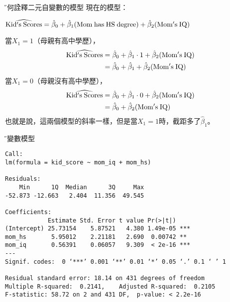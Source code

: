 \documentclass[xcolor=dvipsnames]{beamer}
\begin{document}
\begin{frame}{\H 如何詮釋二元自變數的模型}
現在的模型：
\begin{center}
$\widehat{\mathrm {Kid's\hspace{.25em} Scores}}=\hat{\beta}_{0}+\hat{\beta}_{1}(\mathrm {Mom\hspace{.25em} has\hspace{.25em} HS\hspace{.25em} degree})+\hat{\beta}_{2}(\mathrm {Mom's\hspace{.25em} IQ})$
\end{center}
當$X_{1}=1$（母親有高中學歷），
\begin{align*}
\widehat{\mathrm {Kid's\hspace{.25em} Scores}} & =\hat{\beta}_{0}+\hat{\beta}_{1}\cdot 1+\hat{\beta}_{2}(\mathrm {Mom's\hspace{.25em} IQ})\\
& = \hat{\beta}_{0}+\hat{\beta}_{1}+\hat{\beta}_{2}(\mathrm {Mom's\hspace{.25em} IQ})
\end{align*}
當$X_{1}=0$（母親沒有高中學歷），
\begin{align*}
\widehat{\mathrm {Kid's\hspace{.25em} Scores}} & =\hat{\beta}_{0}+\hat{\beta}_{1}\cdot 0+\hat{\beta}_{2}(\mathrm {Mom's\hspace{.25em} IQ})\\
& = \hat{\beta}_{0}+\hat{\beta}_{2}(\mathrm {Mom's\hspace{.25em} IQ})
\end{align*}
也就是說，這兩個模型的斜率一樣，但是當$X_{1}=1$時，截距多了$\hat{\beta}_{1}$。
\end{frame}
\begin{frame}[fragile=singleslide]{\H 雙變數模型}
\begin{Verbatim}[frame=single,label=R code,
fontseries=b,xleftmargin=2mm,commandchars=\\\{\},
formatcom=\color{blue}]
Call:
lm(formula = kid_score ~ mom_iq + mom_hs)

Residuals:
    Min      1Q  Median      3Q     Max 
-52.873 -12.663   2.404  11.356  49.545 

Coefficients:
            Estimate Std. Error t value Pr(>|t|)    
(Intercept) 25.73154    5.87521   4.380 1.49e-05 ***
mom_hs       5.95012    2.21181   2.690  0.00742 ** 
mom_iq       0.56391    0.06057   9.309  < 2e-16 ***
---
Signif. codes:  0 ‘***’ 0.001 ‘**’ 0.01 ‘*’ 0.05 ‘.’ 0.1 ‘ ’ 1

Residual standard error: 18.14 on 431 degrees of freedom
Multiple R-squared:  0.2141,	Adjusted R-squared:  0.2105 
F-statistic: 58.72 on 2 and 431 DF,  p-value: < 2.2e-16
\end{Verbatim}
\end{frame}
\end{document}
